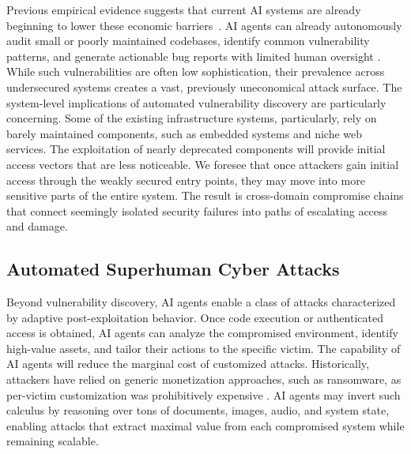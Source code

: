 \documentclass{article}
\theoremstyle{plain}
\theoremstyle{definition}
\theoremstyle{remark}
\begin{document}
Previous empirical evidence suggests that current AI systems are already beginning to lower these economic barriers~\citep{fang2024llm,zhu2024teams}. AI agents can already autonomously audit small or poorly maintained codebases, identify common vulnerability patterns, and generate actionable bug reports with limited human oversight \citep{xu2024large}. While such vulnerabilities are often low sophistication, their prevalence across undersecured systems creates a vast, previously uneconomical attack surface.
The system-level implications of automated vulnerability discovery are particularly concerning. Some of the existing infrastructure systems, particularly, rely on barely maintained components, such as embedded systems and niche web services. The exploitation of nearly deprecated components will provide initial access vectors that are less noticeable. We foresee that once attackers gain initial access through the weakly secured entry points, they may move into more sensitive parts of the entire system. The result is cross-domain compromise chains that connect seemingly isolated security failures into paths of escalating access and damage.




\subsection{Automated Superhuman Cyber Attacks}



Beyond vulnerability discovery, AI agents enable a class of attacks characterized by adaptive post-exploitation behavior. Once code execution or authenticated access is obtained, AI agents can analyze the compromised environment, identify high-value assets, and tailor their actions to the specific victim.
The capability of AI agents will reduce the marginal cost of customized attacks. Historically, attackers have relied on generic monetization approaches, such as ransomware, as per-victim customization was prohibitively expensive \citep{cremonini2005evaluating}. AI agents may invert such calculus by reasoning over tons of documents, images, audio, and system state, enabling attacks that extract maximal value from each compromised system while remaining scalable.
\end{document}
